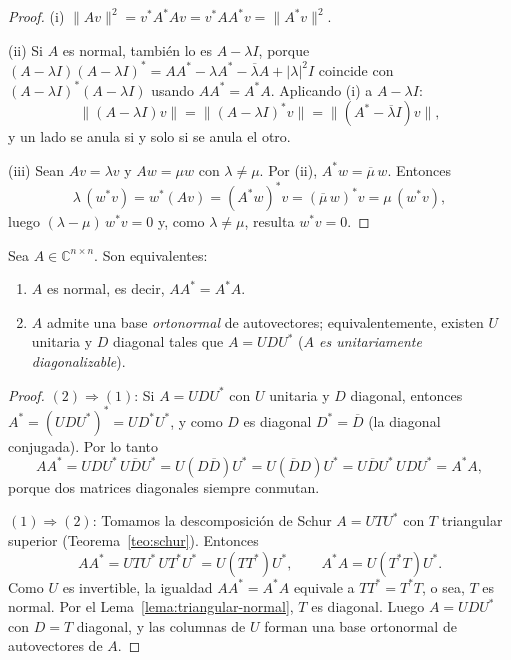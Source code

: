 \begin{proof}
(i) $\|Av\|^{2}=v^{*}A^{*}Av=v^{*}AA^{*}v=\|A^{*}v\|^{2}$.

\smallskip
(ii) Si $A$ es normal, también lo es $A-\lambda I$, porque
$(A-\lambda I)(A-\lambda I)^{*}=AA^{*}-\lambda A^{*}-\overline{\lambda}A+|\lambda|^{2}I$
coincide con $(A-\lambda I)^{*}(A-\lambda I)$ usando $AA^{*}=A^{*}A$.
Aplicando (i) a $A-\lambda I$:
\[
\|(A-\lambda I)v\|=\|(A-\lambda I)^{*}v\|=\|(A^{*}-\overline{\lambda}I)v\| ,
\]
y un lado se anula si y solo si se anula el otro.

\smallskip
(iii) Sean $Av=\lambda v$ y $Aw=\mu w$ con $\lambda\neq\mu$. Por (ii),
$A^{*}w=\overline{\mu}\,w$. Entonces
\[
\lambda\,(w^{*}v)=w^{*}(Av)=(A^{*}w)^{*}v=(\overline{\mu}\,w)^{*}v=\mu\,(w^{*}v),
\]
luego $(\lambda-\mu)\,w^{*}v=0$ y, como $\lambda\neq\mu$, resulta $w^{*}v=0$.
\end{proof}

\begin{theorem}\label{teo:normal-iff-ortonormal}
Sea \(A\in\mathbb{C}^{n\times n}\). Son equivalentes:
\begin{enumerate}
\item \(A\) es normal, es decir, \(AA^{*}=A^{*}A\).
\item \(A\) admite una base \emph{ortonormal} de autovectores; equivalentemente, existen
      $U$ unitaria y $D$ diagonal tales que \(A=U D U^{*}\)
      (\emph{$A$ es unitariamente diagonalizable}).   %
\end{enumerate}
\end{theorem}

\begin{proof}
\((2)\Rightarrow(1)\): Si \(A=U D U^{*}\) con \(U\) unitaria y \(D\) diagonal, entonces
$A^{*}=(UDU^{*})^{*}=UD^{*}U^{*}$, y como $D$ es diagonal $D^{*}=\overline{D}$
(la diagonal conjugada). Por lo tanto   %
\[
AA^{*}=U D U^{*}\,U \overline{D} U^{*}=U (D\overline{D}) U^{*}
      =U (\overline{D}D) U^{*}=U\overline{D}U^{*}\,UDU^{*}=A^{*}A,
\]
porque dos matrices diagonales siempre conmutan.

\smallskip
\((1)\Rightarrow(2)\): Tomamos la descomposición de Schur \(A=U T U^{*}\) con \(T\)
triangular superior (Teorema~\ref{teo:schur}). Entonces
\[
AA^{*}=U T U^{*}\, U T^{*} U^{*}=U(TT^{*})U^{*},\qquad
A^{*}A=U (T^{*} T) U^{*}.
\]
Como $U$ es invertible, la igualdad \(AA^{*}=A^{*}A\) equivale a \(TT^{*}=T^{*}T\),
o sea, \(T\) es normal. Por el Lema~\ref{lema:triangular-normal}, \(T\) es diagonal.
Luego $A=UDU^{*}$ con $D=T$ diagonal, y las columnas de $U$ forman una base ortonormal
de autovectores de $A$.
\end{proof}

